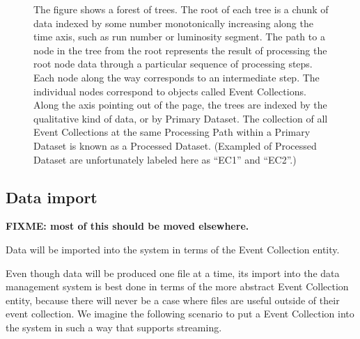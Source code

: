 \begin{figure}[hbtp]
  \begin{center}
    \caption{The figure shows a forest of trees.  The root of each tree is a 
chunk of data indexed by some number monotonically increasing along the time axis, 
such as run number or luminosity segment.
The path to a node in the tree from the root represents the result of processing 
the root node data through a particular sequence of processing steps.  Each node 
along the way corresponds to an intermediate step.  The individual nodes correspond to objects 
called Event Collections.  Along the axis pointing out of the page, the trees are 
indexed by the qualitative kind of data, or by Primary Dataset. The collection of all 
Event Collections at the same Processing Path within a Primary Dataset is known as a
Processed Dataset. (Exampled of Processed Dataset are unfortunately labeled here 
as ``EC1'' and ``EC2''.)}
    \label{fig:forest}
  \end{center}
\end{figure}

\subsection{Data import}

{\bf FIXME: most of this should be moved elsewhere.}

Data will be imported into the system in terms of the 
Event Collection entity.  

Even though data will be produced one file at a time, its import  
into the data management system is best done in terms of the 
more abstract Event Collection entity, because there will 
never be a case where files are useful outside of their event collection. 
We imagine the following scenario to put  a Event Collection 
into the system in such a way that supports streaming.

